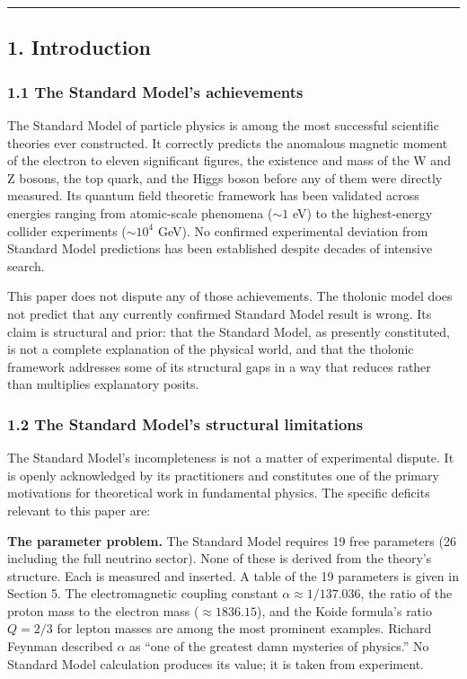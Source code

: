 \documentclass[
  11pt,
  letterpaper,
]{article}
\begin{document}
\begin{center}\rule{0.5\linewidth}{0.5pt}\end{center}

\subsection{1. Introduction}\label{introduction}

\subsubsection{1.1 The Standard Model's
achievements}\label{the-standard-models-achievements}

The Standard Model of particle physics is among the most successful
scientific theories ever constructed. It correctly predicts the
anomalous magnetic moment of the electron to eleven significant figures,
the existence and mass of the W and Z bosons, the top quark, and the
Higgs boson before any of them were directly measured. Its quantum field
theoretic framework has been validated across energies ranging from
atomic-scale phenomena (\(\sim 1\) eV) to the highest-energy collider
experiments (\(\sim 10^4\) GeV). No confirmed experimental deviation
from Standard Model predictions has been established despite decades of
intensive search.

This paper does not dispute any of those achievements. The tholonic
model does not predict that any currently confirmed Standard Model
result is wrong. Its claim is structural and prior: that the Standard
Model, as presently constituted, is not a complete explanation of the
physical world, and that the tholonic framework addresses some of its
structural gaps in a way that reduces rather than multiplies explanatory
posits.

\subsubsection{1.2 The Standard Model's structural
limitations}\label{the-standard-models-structural-limitations}

The Standard Model's incompleteness is not a matter of experimental
dispute. It is openly acknowledged by its practitioners and constitutes
one of the primary motivations for theoretical work in fundamental
physics. The specific deficits relevant to this paper are:

\textbf{The parameter problem.} The Standard Model requires 19 free
parameters (26 including the full neutrino sector). None of these is
derived from the theory's structure. Each is measured and inserted. A
table of the 19 parameters is given in Section 5. The electromagnetic
coupling constant \(\alpha \approx 1/137.036\), the ratio of the proton
mass to the electron mass (\(\approx 1836.15\)), and the Koide formula's
ratio \(Q = 2/3\) for lepton masses are among the most prominent
examples. Richard Feynman described \(\alpha\) as ``one of the greatest
damn mysteries of physics.'' No Standard Model calculation produces its
value; it is taken from experiment.
\end{document}
